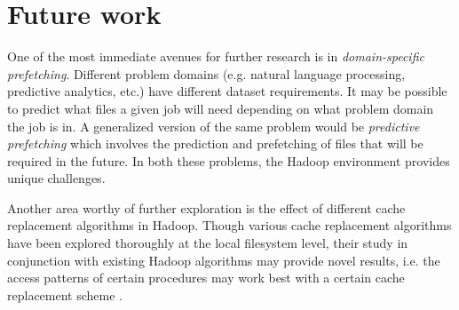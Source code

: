 \documentclass[12pt]{article}
\begin{document}
\section{Future work}\label{sect:future_work}
One of the most immediate avenues for further research is in \textit{domain-specific prefetching}. Different problem domains (e.g. natural language processing, predictive analytics, etc.) have different dataset requirements. It may be possible to predict what files a given job will need depending
on what problem domain the job is in. A generalized version of the same problem would be \textit{predictive prefetching} \cite{griffioen1994reducing} which involves the prediction and prefetching of files that will be required in the future. In both these problems, the Hadoop environment provides unique
challenges.


Another area worthy of further exploration is the effect of different cache replacement algorithms in Hadoop. Though various cache replacement algorithms
have been explored thoroughly at the local filesystem level, their study 
in conjunction with existing Hadoop algorithms may provide novel results, i.e.
the access patterns of certain procedures may work best with a certain
cache replacement scheme \cite{puzak1985analysis}.

\nocite{*}



\end{document}
